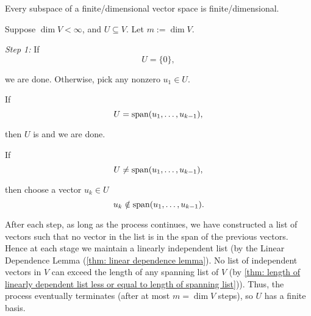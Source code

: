 \setcounter{thm}{24}
\begin{thm} 
  \label{thm: finite-dimensional subspace}
  Every subspace of a finite\-/dimensional vector space is finite\-/dimensional.
\end{thm}
\begin{prf}
  Suppose $\dim V<\infty$, and $U\subseteq V$. Let $m := \dim V$.

  \emph{Step 1:} If
  \begin{equation}
    U = \{0\},
  \end{equation}

  we are done. Otherwise, pick any nonzero $u_1 \in U$.

   If
  \begin{equation}
    U = \operatorname{span} (u_1, \ldots, u_{k-1}),
  \end{equation}

  then $U$ is \fd and we are done.

  If
  \begin{equation}
    U \neq \operatorname{span} (u_1, \ldots, u_{k-1}),
  \end{equation}

  then choose a vector $u_k \in U$ \st
  \begin{equation}
    u_k \notin \operatorname{span} (u_1, \ldots, u_{k-1}).
  \end{equation}

  After each step, as long as the process continues, we have constructed a list of vectors such that no vector in the list is in the span of the previous vectors. Hence at each stage we maintain a linearly independent list (by the Linear Dependence Lemma (\ref{thm: linear dependence lemma}). No list of independent vectors in $V$ can exceed the length of any spanning list of $V$ (by \ref{thm: length of linearly dependent list less or equal to length of spanning list})).
  Thus, the process eventually terminates (after at most $m=\dim V$ steps), so $U$ has a finite basis.
\end{prf}